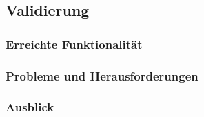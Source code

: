 \subsection{Validierung}


\subsubsection{Erreichte Funktionalität}


\subsubsection{Probleme und Herausforderungen}


\subsubsection{Ausblick}



